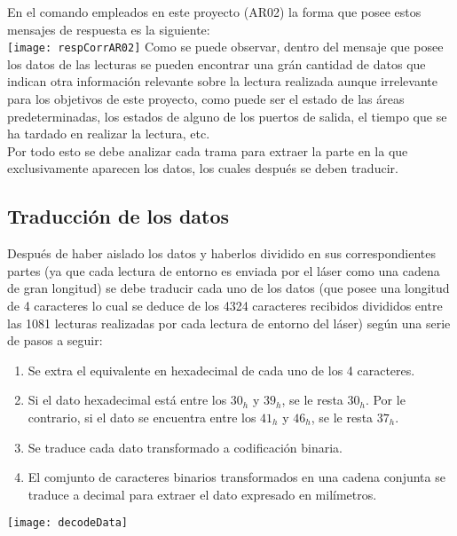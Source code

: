 En el comando empleados en este proyecto (AR02) la forma que posee estos mensajes de respuesta es la siguiente:\\
\texttt{[image: respCorrAR02]}
Como se puede observar, dentro del mensaje que posee los datos de las lecturas se pueden encontrar una grán cantidad de datos que indican otra información relevante sobre la lectura realizada aunque irrelevante para los objetivos de este proyecto, como puede ser el estado de las áreas predeterminadas, los estados de alguno de los puertos de salida, el tiempo que se ha tardado en realizar la lectura, etc.\\
Por todo esto se debe analizar cada trama para extraer la parte en la que exclusivamente aparecen los datos, los cuales después se deben traducir.

\subsection{Traducción de los datos}

Después de haber aislado los datos y haberlos dividido en sus correspondientes partes (ya que cada lectura de entorno es enviada por el láser como una cadena de gran longitud) se debe traducir cada uno de los datos (que posee una longitud de 4 caracteres lo cual se deduce de los 4324 caracteres recibidos divididos entre las 1081 lecturas realizadas por cada lectura de entorno del láser) según una serie de pasos a seguir:
\begin{enumerate}
	\item Se extra el equivalente en hexadecimal de cada uno de los 4 caracteres.
	\item Si el dato hexadecimal está entre los $30_{h}$ y  $39_{h}$, se le resta  $30_{h}$. Por le contrario, si el dato se encuentra entre los  $41_{h}$ y  $46_{h}$, se le resta $37_{h}$.
	\item Se traduce cada dato transformado a codificación binaria.
	\item El comjunto de caracteres binarios transformados en una cadena conjunta se traduce a decimal para extraer el dato expresado en milímetros.
\end{enumerate}
\texttt{[image: decodeData]}